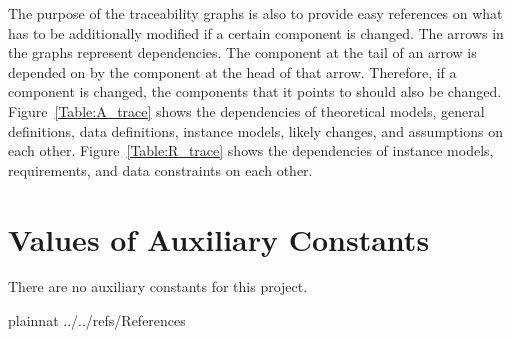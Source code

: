 \documentclass[12pt]{article}
\begin{document}
The purpose of the traceability graphs is also to provide easy references on
what has to be additionally modified if a certain component is changed.  The
arrows in the graphs represent dependencies. The component at the tail of an
arrow is depended on by the component at the head of that arrow. Therefore, if a
component is changed, the components that it points to should also be
changed. Figure~\ref{Table:A_trace} shows the dependencies of theoretical models,
general definitions, data definitions, instance models, likely changes, and
assumptions on each other. Figure~\ref{Table:R_trace} shows the dependencies of
instance models, requirements, and data constraints on each other.




\section{Values of Auxiliary Constants}

There are no auxiliary constants for this project.




\newpage

 {plainnat}
 {../../refs/References}

\end{document}
